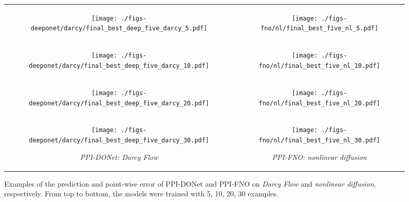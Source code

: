 \begin{figure}
	\centering
	\setlength\tabcolsep{0pt}
	\begin{tabular}[c]{cc}
	\begin{subfigure}[b]{0.48\textwidth}
		\centering
	\texttt{[image: ./figs-deeponet/darcy/final\_best\_deep\_five\_darcy\_5.pdf]}
	\end{subfigure} &
    \begin{subfigure}[b]{0.48\textwidth}
		\centering
	\texttt{[image: ./figs-fno/nl/final\_best\_five\_nl\_5.pdf]}
	\end{subfigure}
 \\
	\begin{subfigure}[b]{0.48\textwidth}
		\centering
		\texttt{[image: ./figs-deeponet/darcy/final\_best\_deep\_five\_darcy\_10.pdf]}
	\end{subfigure} &
 \begin{subfigure}[b]{0.48\textwidth}
		\centering
	\texttt{[image: ./figs-fno/nl/final\_best\_five\_nl\_10.pdf]}
	\end{subfigure}
 \\
 \begin{subfigure}[b]{0.48\textwidth}
		\centering
		\texttt{[image: ./figs-deeponet/darcy/final\_best\_deep\_five\_darcy\_20.pdf]}
	\end{subfigure} &
 \begin{subfigure}[b]{0.48\textwidth}
		\centering
	\texttt{[image: ./figs-fno/nl/final\_best\_five\_nl\_20.pdf]}
	\end{subfigure}
 \\
 \begin{subfigure}[b]{0.48\textwidth}
		\centering
	\texttt{[image: ./figs-deeponet/darcy/final\_best\_deep\_five\_darcy\_30.pdf]}
 \caption{\small \textit{PPI-DONet: Darcy Flow}}\label{fig:darcy-dont-example}
	\end{subfigure} & 
 \begin{subfigure}[b]{0.48\textwidth}
		\centering
	\texttt{[image: ./figs-fno/nl/final\_best\_five\_nl\_30.pdf]}
 \caption{\small \textit{PPI-FNO: nonlinear diffusion}}\label{fig:nl-fno-example}
	\end{subfigure}
\end{tabular}
	\caption{\small Examples of the prediction and point-wise error of PPI-DONet and PPI-FNO on \textit{Darcy Flow} and \textit{nonlinear diffusion}, respectively.  From top to bottom, the models were trained with 5, 10, 20, 30 examples.}
 \vspace{-0.2in}
\end{figure}

